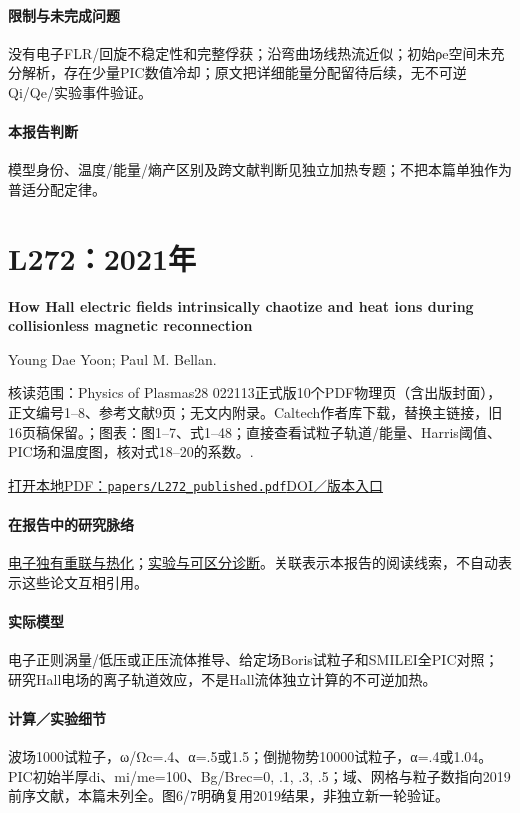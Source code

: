 \paragraph{限制与未完成问题}没有电子FLR/回旋不稳定性和完整俘获；沿弯曲场线热流近似；初始ρe空间未充分解析，存在少量PIC数值冷却；原文把详细能量分配留待后续，无不可逆Qi/Qe/实验事件验证。

\paragraph{本报告判断}模型身份、温度/能量/熵产区别及跨文献判断见独立加热专题；不把本篇单独作为普适分配定律。

\section{L272：2021年}\label{paper:L272}

\textbf{How Hall electric fields intrinsically chaotize and heat ions during collisionless magnetic reconnection}\citep{L272}\

Young Dae Yoon;  Paul M. Bellan.

\textsf{核读范围：}Physics of Plasmas28 022113正式版10个PDF物理页（含出版封面），正文编号1–8、参考文献9页；无文内附录。Caltech作者库下载，替换主链接，旧16页稿保留。；\textsf{图表：}图1–7、式1–48；直接查看试粒子轨道/能量、Harris阈值、PIC场和温度图，核对式18–20的系数。.

\href{run:papers/L272_published.pdf}{打开本地PDF：\texttt{papers/L272\_published.pdf}}\quad\href{https://doi.org/10.1063/5.0040374}{DOI／版本入口}

\paragraph{在报告中的研究脉络}\hyperref[story:energy]{电子独有重联与热化}；\hyperref[story:diagnostic]{实验与可区分诊断}。关联表示本报告的阅读线索，不自动表示这些论文互相引用。

\paragraph{实际模型}电子正则涡量/低压或正压流体推导、给定场Boris试粒子和SMILEI全PIC对照；研究Hall电场的离子轨道效应，不是Hall流体独立计算的不可逆加热。

\paragraph{计算／实验细节}波场1000试粒子，ω/Ωc=.4、α=.5或1.5；倒抛物势10000试粒子，α=.4或1.04。PIC初始半厚di、mi/me=100、Bg/Brec=0, .1, .3, .5；域、网格与粒子数指向2019前序文献，本篇未列全。图6/7明确复用2019结果，非独立新一轮验证。

